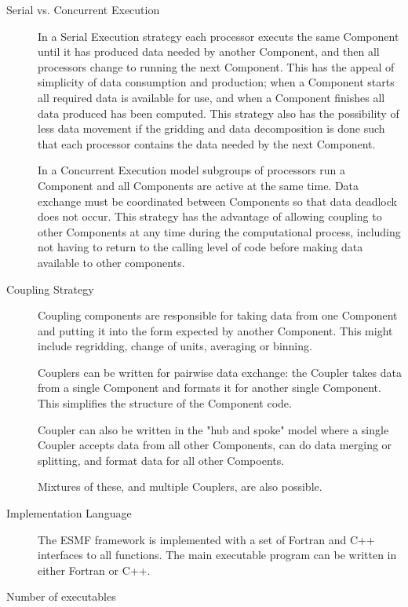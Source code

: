 \begin{description}

\item[Serial vs. Concurrent Execution]

In a Serial Execution strategy each processor 
executs the same Component until it has produced data needed
by another Component, and then all processors change to
running the next Component.  This has the appeal of simplicity
of data consumption and production; when a Component starts
all required data is available for use, and when a Component finishes
all data produced has been computed.  This strategy also has
the possibility of less data movement if the gridding and
data decomposition is done such that each processor contains
the data needed by the next Component.

In a Concurrent Execution model subgroups of processors run
a Component and all Components are active at the same time.  
Data exchange must be coordinated between Components so that
data deadlock does not occur.  This strategy has the advantage
of allowing coupling to other Components at any time during
the computational process, including not having to return to
the calling level of code before making data available to 
other components.

\item[Coupling Strategy]

Coupling components are responsible for taking data from one
Component and putting it into the form expected by another Component.
This might include regridding, change of units, averaging or binning.

Couplers can be written for pairwise data exchange: the Coupler takes
data from a single Component and formats it for another single Component.
This simplifies the structure of the Component code.

Coupler can also be written in the "hub and spoke" model where a
single Coupler accepts data from all other Components, can do data
merging or splitting, and format data for all other Compoents.

Mixtures of these, and multiple Couplers, are also possible.

\item[Implementation Language]

The ESMF framework is implemented with a set of Fortran and C++ interfaces
to all functions.  The main executable program can be written in either
Fortran or C++.

\item[Number of executables]


\end{description}
